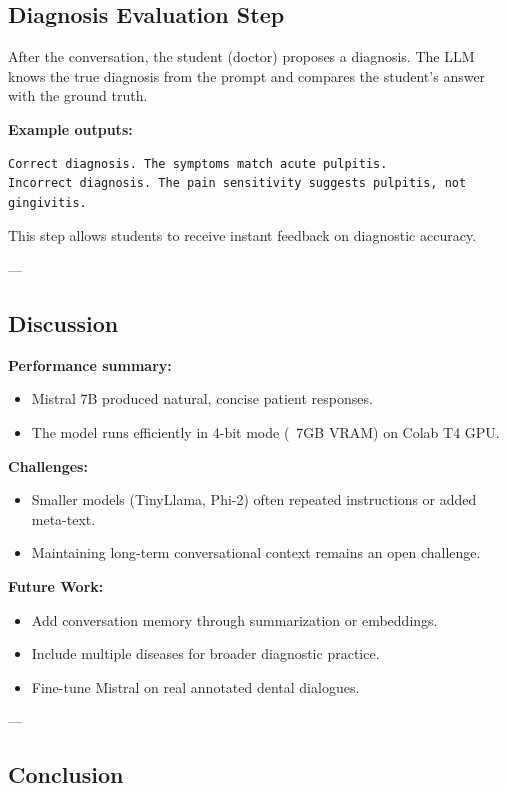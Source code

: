 \subsection{Diagnosis Evaluation Step}

After the conversation, the student (doctor) proposes a diagnosis.  
The LLM knows the true diagnosis from the prompt and compares the student's answer with the ground truth.

\textbf{Example outputs:}
\begin{verbatim}
Correct diagnosis. The symptoms match acute pulpitis.
Incorrect diagnosis. The pain sensitivity suggests pulpitis, not gingivitis.
\end{verbatim}

This step allows students to receive instant feedback on diagnostic accuracy.

---

\subsection{Discussion}

\textbf{Performance summary:}
\begin{itemize}
    \item Mistral 7B produced natural, concise patient responses.
    \item The model runs efficiently in 4-bit mode (~7GB VRAM) on Colab T4 GPU.
\end{itemize}

\textbf{Challenges:}
\begin{itemize}
    \item Smaller models (TinyLlama, Phi-2) often repeated instructions or added meta-text.
    \item Maintaining long-term conversational context remains an open challenge.
\end{itemize}

\textbf{Future Work:}
\begin{itemize}
    \item Add conversation memory through summarization or embeddings.
    \item Include multiple diseases for broader diagnostic practice.
    \item Fine-tune Mistral on real annotated dental dialogues.
\end{itemize}

---

\subsection{Conclusion}

